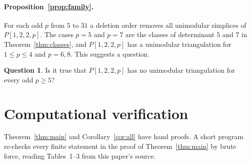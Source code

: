 \documentclass[11pt]{article}
\theoremstyle{definition}
\newtheorem{question}[theorem]{Question}
\begin{document}
\paragraph{Proposition~\ref{prop:family}.}
For each odd $p$ from $5$ to $31$ a deletion order removes all unimodular
simplices of $P[1,2,2,p]$. The cases $p=5$ and $p=7$ are the classes of
determinant $5$ and $7$ in Theorem~\ref{thm:classes}, and $P[1,2,2,p]$ has a
unimodular triangulation for $1\le p\le4$ and $p=6,8$. This suggests a
question.

\begin{question}
Is it true that $P[1,2,2,p]$ has no unimodular triangulation for every odd
$p\ge5$?
\end{question}

\section{Computational verification}\label{sec:verification}

Theorem~\ref{thm:main} and Corollary~\ref{cor:all} have hand proofs. A short
program re-checks every finite statement in the proof of
Theorem~\ref{thm:main} by brute force, reading Tables~1--3 from this
paper's source.
\end{document}
